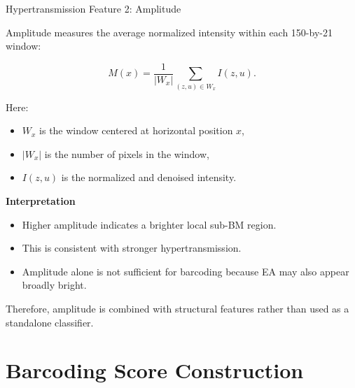 \documentclass[aspectratio=169]{beamer}
\begin{document}
\begin{frame}{Hypertransmission Feature 2: Amplitude}

Amplitude measures the average normalized intensity within each 150-by-21
window:

\[
M(x)
=
\frac{1}{|W_x|}
\sum_{(z,u)\in W_x}
I(z,u).
\]

Here:

\begin{itemize}
    \item \(W_x\) is the window centered at horizontal position \(x\),
    \item \(|W_x|\) is the number of pixels in the window,
    \item \(I(z,u)\) is the normalized and denoised intensity.
\end{itemize}

\vspace{0.3cm}

\textbf{Interpretation}

\begin{itemize}
    \item Higher amplitude indicates a brighter local sub-BM region.
    \item This is consistent with stronger hypertransmission.
    \item Amplitude alone is not sufficient for barcoding because EA may also
    appear broadly bright.
\end{itemize}

Therefore, amplitude is combined with structural features rather than used as
a standalone classifier.

\end{frame}


\section{Barcoding Score Construction}
\end{document}
